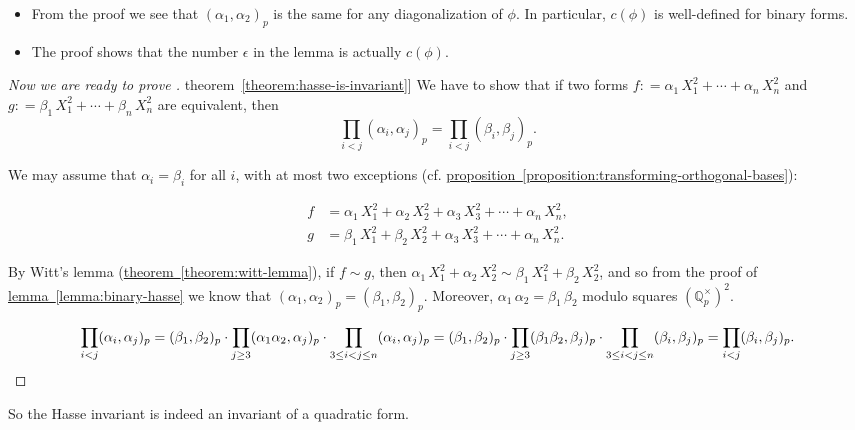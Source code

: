 \documentclass{article}
\newcommand{\dfn}{\mathrel{\mathop:}=}
\newcommand{\QQ}{\mathbb{Q}}
\newcommand{\refref}[2]{\hyperref[#2]{#1~\ref*{#2}}}
\theoremstyle{myplain}
\theoremstyle{mydefinition}
\begin{document}
\begin{itemize}
\item From the proof we see that $(\alpha_1,\alpha_2)_p$ is the same for any
  diagonalization of $\phi$. In particular, $c (\phi)$ is well-defined for
  binary forms.

\item The proof shows that the number $\epsilon$ in the lemma is actually
  $c (\phi)$.
\end{itemize}

\begin{proof}[Now we are ready to prove \refref{theorem}{theorem:hasse-is-invariant}]
  We have to show that if two forms
  $f \dfn \alpha_1\,X_1^2 + \cdots + \alpha_n\,X_n^2$ and
  $g \dfn \beta_1\,X_1^2 + \cdots + \beta_n\,X_n^2$ are equivalent, then
  \[ \prod_{i < j} (\alpha_i, \alpha_j)_p = \prod_{i < j} (\beta_i,\beta_j)_p. \]

  We may assume that $\alpha_i = \beta_i$ for all $i$, with at most two
  exceptions
  (cf. \refref{proposition}{proposition:transforming-orthogonal-bases}):

  \begin{align*}
    f & = \alpha_1\,X_1^2 + \alpha_2\,X_2^2 + \alpha_3\,X_3^2 + \cdots + \alpha_n\,X_n^2,\\
    g & = \beta_1\,X_1^2 + \beta_2\,X_2^2 + \alpha_3\,X_3^2 + \cdots + \alpha_n\,X_n^2.
  \end{align*}

  By Witt's lemma (\refref{theorem}{theorem:witt-lemma}), if $f \sim g$, then
  $\alpha_1\,X_1^2 + \alpha_2\,X_2^2 \sim \beta_1\,X_1^2 + \beta_2\,X_2^2$, and
  so from the proof of \refref{lemma}{lemma:binary-hasse} we know that
  $(\alpha_1,\alpha_2)_p = (\beta_1,\beta_2)_p$. Moreover,
  $\alpha_1\,\alpha_2 = \beta_1\,\beta_2$ modulo squares $(\QQ_p^\times)^2$.

  \[ \prod_{i < j} (\alpha_i,\alpha_j)_p =
    (\beta_1,\beta_2)_p \cdot
    \prod_{j\ge 3} (\alpha_1\alpha_2, \alpha_j)_p \cdot
    \prod_{3 \le i < j \le n} (\alpha_i,\alpha_j)_p =
    (\beta_1,\beta_2)_p \cdot
    \prod_{j\ge 3} (\beta_1\beta_2, \beta_j)_p \cdot
    \prod_{3 \le i < j \le n} (\beta_i,\beta_j)_p =
    \prod_{i < j} (\beta_i,\beta_j)_p. \qedhere \]
\end{proof}

So the Hasse invariant is indeed an invariant of a quadratic form.
\end{document}

